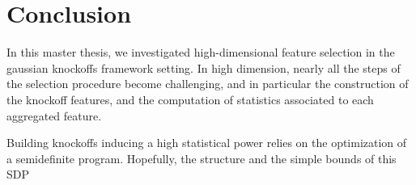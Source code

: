 \cleardoublepage
\chapter*{Conclusion}

In this master thesis,
we investigated high-dimensional feature selection
in the gaussian knockoffs framework setting.
In high dimension, nearly all the steps of the selection procedure become challenging,
and in particular the construction of the knockoff features,
and the computation of statistics associated to each aggregated feature.

Building knockoffs inducing a high statistical power relies on the optimization of a semidefinite program.
Hopefully, the structure and the simple bounds of this SDP
